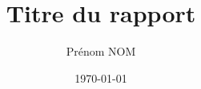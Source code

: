 \documentclass[12pt,a4paper]{report}
\begin{document}
\title{Titre du rapport}

\author{Prénom NOM}

\date{\today}
\maketitle
\tableofcontents

\setcounter{page}{1}




\
% 






\appendix

% 

\end{document}
